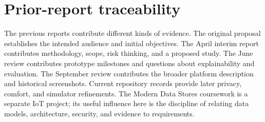 \section{Prior-report traceability}

The previous reports contribute different kinds of evidence. The original proposal establishes the intended audience and initial objectives. The April interim report contributes methodology, scope, risk thinking, and a proposed study. The June review contributes prototype milestones and questions about explainability and evaluation. The September review contributes the broader platform description and historical screenshots. Current repository records provide later privacy, comfort, and simulator refinements. The Modern Data Stores coursework is a separate IoT project; its useful influence here is the discipline of relating data models, architecture, security, and evidence to requirements.

